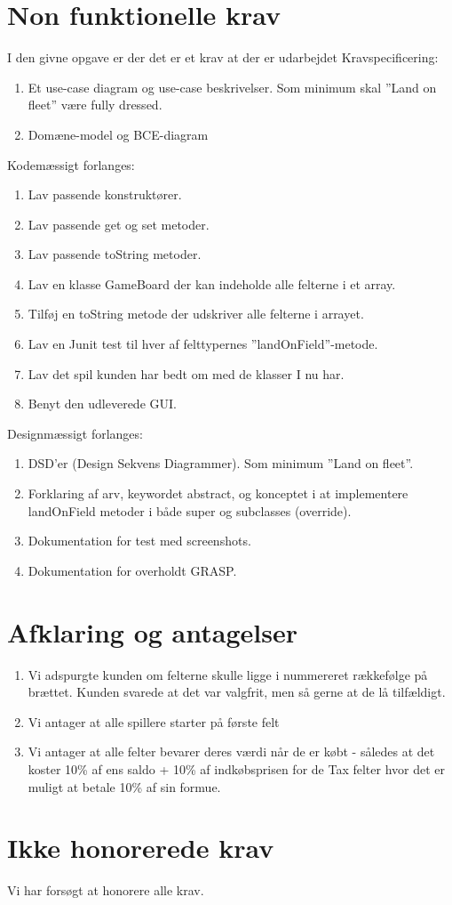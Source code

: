 \section*{Non funktionelle krav}
I den givne opgave er der det er et krav at der er udarbejdet
Kravspecificering:
\begin{enumerate}
  \item Et use-case diagram og use-case beskrivelser. Som minimum skal ”Land on
  fleet” være fully dressed.
  \item Domæne-model og BCE-diagram
\end{enumerate}
Kodemæssigt forlanges:
\begin{enumerate}
  \item Lav passende konstruktører.
  \item Lav passende get og set metoder.
  \item Lav passende toString metoder.
  \item Lav en klasse GameBoard der kan indeholde alle felterne i et array.
  \item Tilføj en toString metode der udskriver alle felterne i arrayet.
  \item Lav en Junit test til hver af felttypernes ”landOnField”-metode.
  \item Lav det spil kunden har bedt om med de klasser I nu har.
  \item Benyt den udleverede GUI.
\end{enumerate}
Designmæssigt forlanges:
\begin{enumerate}
  \item DSD’er (Design Sekvens Diagrammer). Som minimum ”Land on fleet”.
  \item Forklaring af arv, keywordet abstract, og konceptet i at implementere
  landOnField metoder i både super og subclasses (override).
  \item Dokumentation for test med screenshots.
  \item Dokumentation for overholdt GRASP.
\end{enumerate}
\section*{Afklaring og antagelser}
\begin{enumerate}
  \item Vi adspurgte kunden om felterne skulle ligge i nummereret rækkefølge på
  brættet. Kunden svarede at det var valgfrit, men så gerne at de lå tilfældigt.
  \item Vi antager at alle spillere starter på første felt
  \item Vi antager at alle felter bevarer deres værdi når de er købt - således
  at det koster 10\% af ens saldo + 10\% af indkøbsprisen for de Tax felter hvor
  det er muligt at betale 10\% af sin formue.
\end{enumerate}
\section*{Ikke honorerede krav}
Vi har forsøgt at honorere alle krav.\\